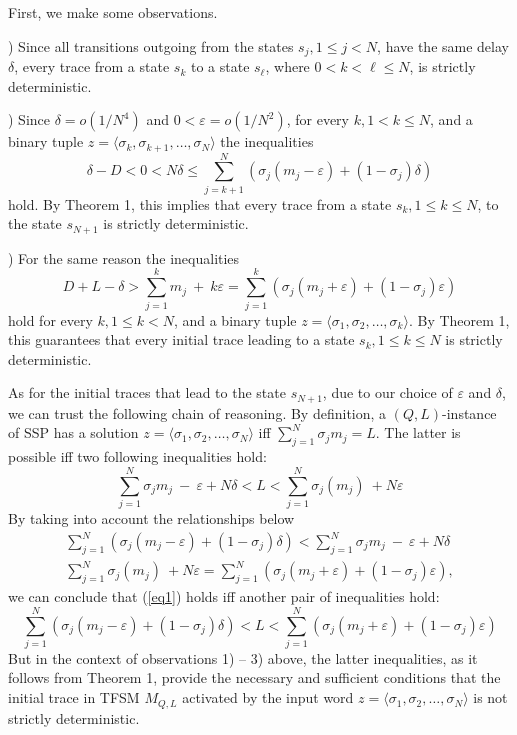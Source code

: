 \documentclass[conference]{IEEEtran}
\begin{document}
First, we make some observations.
\smallskip

) Since all transitions outgoing from the states $s_j, 1\leq j <N$, have the same delay $\delta$, every trace from a state $s_k$ to a state $s_\ell$, where $0<k<\ell\leq N$, is strictly deterministic.
\smallskip

) Since $\delta=o(1/N^4)$ and $0<\varepsilon=o(1/N^2)$, for every $k, 1<k\leq N$, and a binary tuple $z=\langle\sigma_k,\sigma_{k+1},\dots,\sigma_N\rangle$ the inequalities
$$
\delta-D <0 < N\delta \leq \sum\limits_{j=k+1}^N (\sigma_j (m_j-\varepsilon)+(1-\sigma_j)\delta) 
$$ 
hold. By Theorem 1, this implies that every trace from a state $s_k, 1\leq k \leq N$, to the state $s_{N+1}$ is strictly deterministic. 
\smallskip

) For the same reason the inequalities
$$
D+L-\delta > \sum\limits_{j=1}^k m_j \ + \ k\varepsilon =\sum\limits_{j=1}^k (\sigma_j (m_j+\varepsilon)+(1-\sigma_j)\varepsilon)
$$
hold for every $k, 1\leq k< N$, and a binary tuple $z=\langle\sigma_1,\sigma_{2},\dots,\sigma_k\rangle$. By Theorem 1, this guarantees that every initial trace leading to a state $s_k, 1\leq k \leq N$ is strictly deterministic. 
\smallskip

As for the initial traces that lead to the state $s_{N+1}$, due to our choice of $\varepsilon$ and $\delta$, we can trust the following chain of reasoning. By definition, a $(Q,L)$-instance of SSP has a solution $z=\langle\sigma_1,\sigma_{2},\dots,\sigma_N\rangle$ iff $\sum\limits_{j=1}^N \sigma_j m_j=L$. The latter is possible iff two following inequalities hold:
\begin{equation}\label{eq1}
\sum\limits_{j=1}^N \sigma_j m_j \ - \ \varepsilon + N\delta < L < \sum\limits_{j=1}^N \sigma_j (m_j) \ + N\varepsilon  
\end{equation}
By taking into account the relationships below
$$
\begin{array}{l}
\sum\limits_{j=1}^N (\sigma_j (m_j - \varepsilon) + (1-\sigma_j)\delta) < \sum\limits_{j=1}^N \sigma_j m_j \ - \ \varepsilon + N\delta\\
\sum\limits_{j=1}^N \sigma_j (m_j) \ + N\varepsilon = \sum\limits_{j=1}^N (\sigma_j (m_j + \varepsilon) + (1-\sigma_j)\varepsilon),
\end{array}
$$ 
we can conclude that (\ref{eq1}) holds iff another pair of inequalities hold:
$$
\sum\limits_{j=1}^N (\sigma_j (m_j - \varepsilon) + (1-\sigma_j)\delta) < L < \sum\limits_{j=1}^N (\sigma_j (m_j + \varepsilon) + (1-\sigma_j)\varepsilon)  
$$
But in the context of observations 1) -- 3) above, the latter inequalities, as it follows from Theorem 1, provide the necessary and sufficient conditions that the initial trace in TFSM $M_{Q,L}$ activated by the input word $z=\langle\sigma_1,\sigma_{2},\dots,\sigma_N\rangle$ is not strictly deterministic. 
\end{document}
